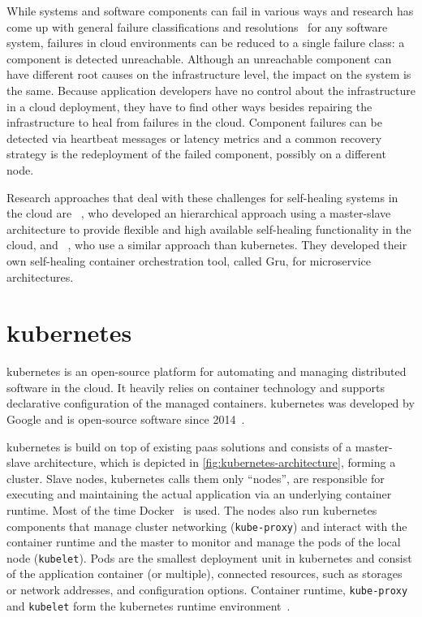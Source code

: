   While systems and software components can fail in various ways and research has come up with general failure classifications and resolutions~\cite[Tab.~1]{PsaierSurvey} for any software system, failures in cloud environments can be reduced to a single failure class: a component is detected unreachable.
  Although an unreachable component can have different root causes on the infrastructure level, the impact on the system is the same.
  Because application developers have no control about the infrastructure in a cloud deployment, they have to find other ways besides repairing the infrastructure to heal from failures in the cloud.
  Component failures can be detected via heartbeat messages or latency metrics and a common recovery strategy is the redeployment of the failed component, possibly on a different node.

  Research approaches that deal with these challenges for self-healing systems in the cloud are \citeauthor{StackCloud}~\cite{StackCloud}, who developed an hierarchical approach using a master-slave architecture to provide flexible and high available self-healing functionality in the cloud, and \citeauthor{gru}~\cite{gru}, who use a similar approach than \gls{kubernetes}.
  They developed their own self-healing container orchestration tool, called Gru, for microservice architectures.

\section[Kubernetes]{\gls{kubernetes}}\label{sec:kubernetes}
  \Gls{kubernetes} is an open-source platform for automating and managing distributed software in the cloud.
  It heavily relies on container technology and supports declarative configuration of the managed containers.
  \Gls{kubernetes} was developed by Google and is open-source software since 2014~\cite{kubernetes}.

  \Gls{kubernetes} is build on top of existing \gls{paas} solutions and consists of a master-slave architecture, which is depicted in \cref{fig:kubernetes-architecture}, forming a cluster.
  Slave nodes, \gls{kubernetes} calls them only \enquote{nodes}, are responsible for executing and maintaining the actual application via an underlying container runtime.
  Most of the time Docker~\cite{docker} is used.
  The nodes also run \gls{kubernetes} components that manage cluster networking (\texttt{kube-proxy}) and interact with the container runtime and the master to monitor and manage the pods of the local node (\texttt{kubelet}).
  Pods are the smallest deployment unit in \gls{kubernetes} and consist of the application container (or multiple), connected resources, such as storages or network addresses, and configuration options.
  Container runtime, \texttt{kube-proxy} and \texttt{kubelet} form the \gls{kubernetes} runtime environment~\cite{kubernetesdoc}.

